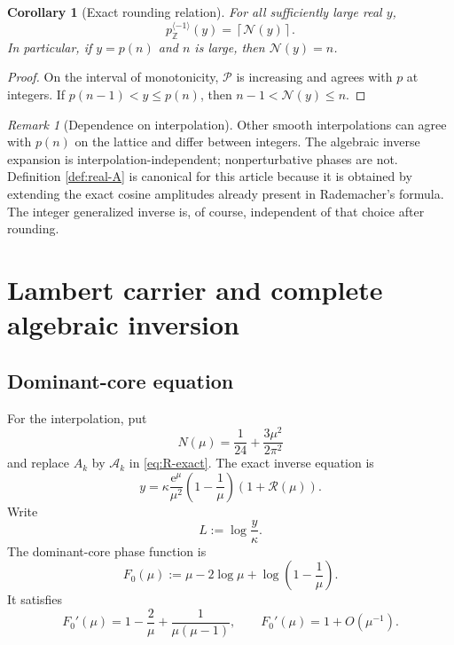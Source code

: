 \documentclass[11pt,a4paper]{article}
\numberwithin{equation}{section}
\newtheorem{corollary}[theorem]{Corollary}
\theoremstyle{definition}
\theoremstyle{remark}
\newtheorem{remark}[theorem]{Remark}
\newcommand{\e}{\mathrm e}
\newcommand{\Z}{\mathbb Z}
\newcommand{\Acal}{\mathcal A}
\newcommand{\Pcal}{\mathcal P}
\newcommand{\Ncal}{\mathcal N}
\newcommand{\Rcal}{\mathcal R}
\newcommand{\ceil}[1]{\left\lceil#1\right\rceil}
\begin{document}
\begin{corollary}[Exact rounding relation]\label{cor:rounding}
For all sufficiently large real $y$,
\begin{equation}\label{eq:rounding}
 \boxed{
 p_{\Z}^{\langle-1\rangle}(y)=\ceil{\Ncal(y)}.}
\end{equation}
In particular, if $y=p(n)$ and $n$ is large, then $\Ncal(y)=n$.
\end{corollary}

\begin{proof}
On the interval of monotonicity, $\Pcal$ is increasing and agrees with $p$ at
integers.  If $p(n-1)<y\leq p(n)$, then $n-1<\Ncal(y)\leq n$.
\end{proof}

\begin{remark}[Dependence on interpolation]\label{rem:interpolation-dependence}
Other smooth interpolations can agree with $p(n)$ on the lattice and differ
between integers.  The algebraic inverse expansion is interpolation-independent;
nonperturbative phases are not.  Definition \ref{def:real-A} is canonical for
this article because it is obtained by extending the exact cosine amplitudes
already present in Rademacher's formula.  The integer generalized inverse is,
of course, independent of that choice after rounding.
\end{remark}

\section{Lambert carrier and complete algebraic inversion}

\subsection{Dominant-core equation}

For the interpolation, put
\begin{equation}\label{eq:Nmu-cont}
 N(\mu)=\frac1{24}+\frac{3\mu^2}{2\pi^2}
\end{equation}
and replace $A_k$ by $\Acal_k$ in \eqref{eq:R-exact}.  The exact inverse
equation is
\begin{equation}\label{eq:inverse-master}
 y=\kappa\frac{\e^\mu}{\mu^2}
 \left(1-\frac1\mu\right)(1+\Rcal(\mu)).
\end{equation}
Write
\begin{equation}\label{eq:L-def}
 L:=\log\frac{y}{\kappa}.
\end{equation}
The dominant-core phase function is
\begin{equation}\label{eq:F0}
 F_0(\mu):=\mu-2\log\mu+\log\left(1-\frac1\mu\right).
\end{equation}
It satisfies
\begin{equation}\label{eq:F0-derivatives}
 F_0'(\mu)=1-\frac2\mu+\frac1{\mu(\mu-1)},
 \qquad F_0'(\mu)=1+O(\mu^{-1}).
\end{equation}
\end{document}
